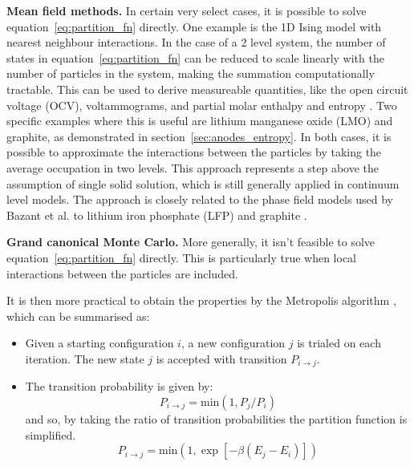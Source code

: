\documentclass[journal=jacsat,manuscript=article]{achemso}
\begin{document}
\textbf{Mean field methods.} In certain very select cases, it is possible to solve equation~\ref{eq:partition_fn} directly. One example is the 1D Ising model with nearest neighbour interactions. In the case of a 2 level system, the number of states in equation~\ref{eq:partition_fn} can be reduced to scale linearly with the number of particles in the system, making the summation computationally tractable. This can be used to derive measureable quantities, like the open circuit voltage (OCV), voltammograms, and partial molar enthalpy and entropy \cite{schlueter_quantifying_2018,Leiva2017b,Mercer2019}. Two specific examples where this is useful are lithium manganese oxide (LMO) and graphite, as demonstrated in section~\ref{sec:anodes_entropy}. In both cases, it is possible to approximate the interactions between the particles by taking the average occupation in two levels. This approach represents a step above the assumption of single solid solution, which is still generally applied in continuum level models. The approach is closely related to the phase field models used by Bazant et al. to lithium iron phosphate (LFP) and graphite \cite{Bazant2017}.
    
\textbf{Grand canonical Monte Carlo.} More generally, it isn't feasible to solve equation~\ref{eq:partition_fn} directly. This is particularly true when local interactions between the particles are included. 

It is then more practical to obtain the properties by the Metropolis algorithm \cite{Metropolis1953}, which can be summarised as:

\begin{itemize}
    \item Given a starting configuration $i$, a new configuration $j$ is trialed on each iteration. The new state $j$ is accepted with transition $P_{i \rightarrow j}$.
    \item The transition probability is given by:
    \begin{equation}
        P_{i \rightarrow j} = \textrm{min}\left(1,P_{j}/P_{i}\right)
        \label{eq:trans_prob}
    \end{equation}
    and so, by taking the ratio of transition probabilities the partition function is simplified.
    \begin{equation}
    P_{i \rightarrow j} = \textrm{min}\left(1,\exp[-{\beta}({E_{j}-E_{i}})]\right)
        \label{eq:trans_prob}
    \end{equation}
\end{itemize}
\end{document}

